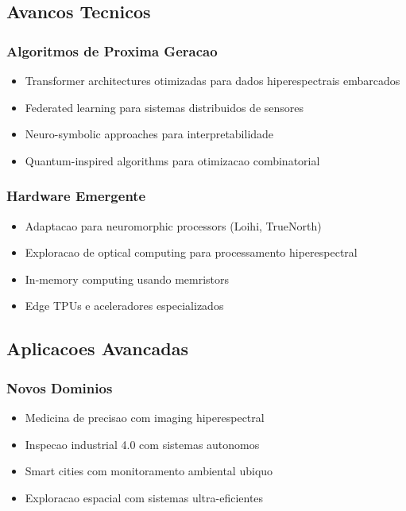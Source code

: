 \subsection{Avancos Tecnicos}

\subsubsection{Algoritmos de Proxima Geracao}
\begin{itemize}
    \item Transformer architectures otimizadas para dados hiperespectrais embarcados
    \item Federated learning para sistemas distribuidos de sensores
    \item Neuro-symbolic approaches para interpretabilidade
    \item Quantum-inspired algorithms para otimizacao combinatorial
\end{itemize}

\subsubsection{Hardware Emergente}
\begin{itemize}
    \item Adaptacao para neuromorphic processors (Loihi, TrueNorth)
    \item Exploracao de optical computing para processamento hiperespectral
    \item In-memory computing usando memristors
    \item Edge TPUs e aceleradores especializados
\end{itemize}

\subsection{Aplicacoes Avancadas}

\subsubsection{Novos Dominios}
\begin{itemize}
    \item Medicina de precisao com imaging hiperespectral
    \item Inspecao industrial 4.0 com sistemas autonomos
    \item Smart cities com monitoramento ambiental ubiquo
    \item Exploracao espacial com sistemas ultra-eficientes
\end{itemize}

